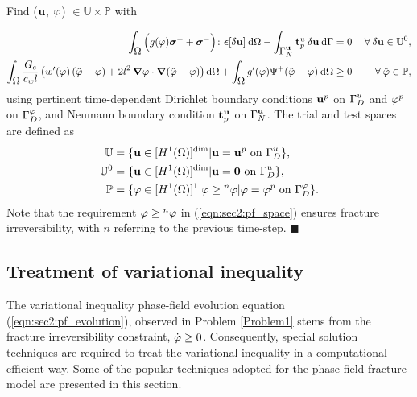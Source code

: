 \documentclass[11pt]{article}
\begin{document}
\begin{vproblem}\label{Problem1}
Find ($\hbox{$\mathbf{u}$}$, $\hbox{$\varphi$}$) $\in \mathbb{U} \times \mathbb{P}$ with

\begin{subequations}
\begin{align}
\int_{\hbox{$\Omega$}}^{} \Big( g(\hbox{$\varphi$}) \hbox{$\hbox{\boldmath$\sigma$}^+$} + \hbox{$\hbox{\boldmath$\sigma$}^-$} \Big) \colon\hbox{$\hbox{\boldmath$\epsilon$}$}[\hbox{$\delta\mathbf{u}$}] \: \normalfont \text{d} \hbox{$\Omega$} - \int_{\hbox{$\hbox{$\Gamma$}_{N}^{\scriptsize{\hbox{$\mathbf{u}$}}}$}}^{} \hbox{$\mathbf{t}_{p}^{\scriptsize{\hbox{$u$}}}$} \: \hbox{$\delta\mathbf{u}$} \: \normalfont \text{d}\hbox{$\Gamma$} &= 0  & \: \forall \: \hbox{$\delta\mathbf{u}$} \in \mathbb{U}^0, \label{eqn:sec2:EL_momentumbalance} \\
\int_{\hbox{$\Omega$}}^{} \dfrac{\hbox{$G_c$}}{c_w \hbox{$l$}} \left( w'(\hbox{$\varphi$}) \, (\hat{\hbox{$\varphi$}}-\hbox{$\varphi$}) + 2\hbox{$l$}^2 \, \hbox{\boldmath$\nabla$} \hbox{$\varphi$}\cdot \hbox{\boldmath$\nabla$} (\hat{\hbox{$\varphi$}}-\hbox{$\varphi$}) \right) \normalfont \text{d}\hbox{$\Omega$} + \int_{\hbox{$\Omega$}}^{} g'(\hbox{$\varphi$}) \Psi^+ (\hat{\hbox{$\varphi$}}-\hbox{$\varphi$}) \: \text{d}\hbox{$\Omega$} & \geq 0 & \: \forall \: \hat{\hbox{$\varphi$}} \in \mathbb{P}, \label{eqn:sec2:pf_evolution} 
\end{align}
\end{subequations}
\noindent using pertinent time-dependent Dirichlet boundary conditions $\hbox{$\mathbf{u}$}^p$ on $\hbox{$\hbox{$\Gamma$}_{D}^{\scriptsize{u}}$}$ and $\hbox{$\varphi$}^p$ on $\hbox{$\hbox{$\Gamma$}_{D}^{\scriptsize{\hbox{$\varphi$}}}$}$, and Neumann boundary condition $\hbox{$\mathbf{t}_{p}^{\scriptsize{\hbox{$\mathbf{u}$}}}$}$ on $\hbox{$\hbox{$\Gamma$}_{N}^{\scriptsize{\hbox{$\mathbf{u}$}}}$}$. The trial and test spaces are defined as
\begin{subequations}
\begin{align}
\mathbb{U} & = \{ \hbox{$\mathbf{u}$} \in [H^1(\hbox{$\Omega$})]^{\normalfont\text{dim}}| \hbox{$\mathbf{u}$} = \hbox{$\mathbf{u}$}^p \text{ on } \hbox{$\hbox{$\Gamma$}_{D}^{\scriptsize{u}}$} \},  {\label{eqn:sec2:disp_space}} \\ 
\mathbb{U}^0 & = \{ \hbox{$\mathbf{u}$} \in [H^1(\hbox{$\Omega$})]^{\normalfont\text{dim}}| \hbox{$\mathbf{u}$} = \mathbf{0} \text{ on } \hbox{$\hbox{$\Gamma$}_{D}^{\scriptsize{u}}$} \},  {\label{eqn:sec2:test_disp_space}} \\
\mathbb{P} & = \{ \hbox{$\varphi$} \in [H^1(\hbox{$\Omega$})]^1 | \hbox{$\varphi$} \geq {}^{n}\hbox{$\varphi$} |\hbox{$\varphi$} = \hbox{$\varphi$}^p \text{ on } \hbox{$\hbox{$\Gamma$}_{D}^{\scriptsize{\hbox{$\varphi$}}}$} \}.  {\label{eqn:sec2:pf_space}}
\end{align}
\end{subequations}
Note that the requirement $\hbox{$\varphi$} \geq {}^{n}\hbox{$\varphi$}$ in (\ref{eqn:sec2:pf_space}) ensures fracture irreversibility, with $n$ referring to the previous time-step. {\color{black}\hfill $\blacksquare$}
\end{vproblem}


\subsection{Treatment of variational inequality}

The variational inequality phase-field evolution equation (\ref{eqn:sec2:pf_evolution}), observed in Problem \ref{Problem1} stems from the fracture irreversibility constraint, $\dot{\hbox{$\varphi$}} \geq 0$. Consequently, special solution techniques are required to treat the variational inequality in a computational efficient way. Some of the popular techniques adopted for the phase-field fracture model are presented in this section.
\end{document}
